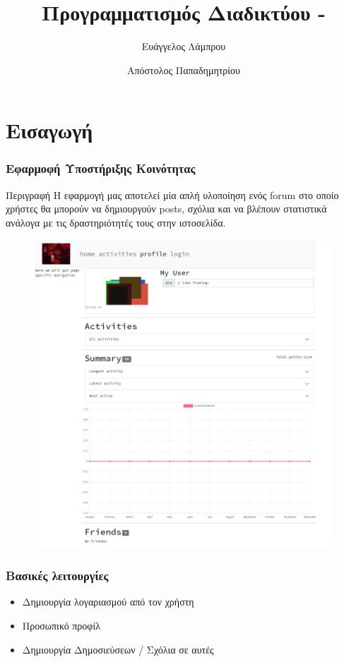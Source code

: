 \documentclass[pdf]{beamer}
\title{Προγραμματισμός Διαδικτύου - \en{Project}}
\date{}
\author{Ευάγγελος Λάμπρου \and Απόστολος Παπαδημητρίου}
\newcommand{\en}[1]{\foreignlanguage{english}{#1}}
\begin{document}
\begin{frame}
    \maketitle
\end{frame}

\section{Εισαγωγή}

\begin{frame}
    \frametitle{Εφαρμοφή Υποστήριξης Κοινότητας}

    \begin{block}{Περιγραφή}
        Η εφαρμογή μας αποτελεί μία απλή υλοποίηση ενός 
        \en{forum} στο οποίο χρήστες θα μπορούν να δημιουργούν
        \en{posts}, σχόλια και να βλέπουν στατιστικά ανάλογα με τις 
        δραστηριότητές τους στην ιστοσελίδα.
    \end{block}
    
   \begin{figure}[htpb]
       \centering
        \includegraphics[width=.4\textwidth]{./assets/site.png}
   \end{figure} 
    
\end{frame}

\begin{frame}

    \frametitle{Βασικές λειτουργίες}

    \begin{itemize}
        \item Δημιουργία λογαριασμού από τον χρήστη
        \item Προσωπικό προφίλ
        \item Δημιουργία Δημοσιεύσεων / Σχόλια σε αυτές
    \end{itemize}
    
\end{frame}
\end{document}
